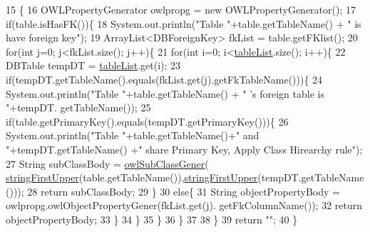 \begin{DoxyCode}
15                                                       \{
16         OWLPropertyGenerator owlpropg = \textcolor{keyword}{new} OWLPropertyGenerator();
17         \textcolor{keywordflow}{if}(table.isHasFK())\{
18               System.out.println(\textcolor{stringliteral}{"Table "}+table.getTableName() + \textcolor{stringliteral}{" is have foreign key"});
19               ArrayList<DBForeignKey> fkList = table.getFKlist();
20              \textcolor{keywordflow}{for}(\textcolor{keywordtype}{int} j=0; j<fkList.size(); j++)\{
21                  \textcolor{keywordflow}{for}(\textcolor{keywordtype}{int} i=0; i<\mbox{\hyperlink{classcom_1_1github_1_1aites_1_1framework_1_1ruleset_1_1_o_w_l_class_generator_a994d90ead25bc6713618ff0dbff19445}{tableList}}.size(); i++)\{
22                      DBTable tempDT = \mbox{\hyperlink{classcom_1_1github_1_1aites_1_1framework_1_1ruleset_1_1_o_w_l_class_generator_a994d90ead25bc6713618ff0dbff19445}{tableList}}.get(i);
23                      \textcolor{keywordflow}{if}(tempDT.getTableName().equals(fkList.get(j).getFkTableName()))\{
24                          System.out.println(\textcolor{stringliteral}{"Table "}+table.getTableName() + \textcolor{stringliteral}{" 's foreign table is "}+tempDT.
      getTableName());
25                          \textcolor{keywordflow}{if}(table.getPrimaryKey().equals(tempDT.getPrimaryKey()))\{
26                              System.out.println(\textcolor{stringliteral}{"Table "}+table.getTableName()+\textcolor{stringliteral}{" and "}+tempDT.getTableName()
      +\textcolor{stringliteral}{" share Primary Key, Apply Class Hirearchy rule"});
27                              String subClassBody = \mbox{\hyperlink{classcom_1_1github_1_1aites_1_1framework_1_1ruleset_1_1_o_w_l_class_generator_a0cf36bb6d9f8f69733fec05db8c82f09}{owlSubClassGener}}(
      \mbox{\hyperlink{classcom_1_1github_1_1aites_1_1framework_1_1ruleset_1_1_o_w_l_class_generator_aff3030ae03e75f8aa2b2114fc9a526d8}{stringFirstUpper}}(table.getTableName()),\mbox{\hyperlink{classcom_1_1github_1_1aites_1_1framework_1_1ruleset_1_1_o_w_l_class_generator_aff3030ae03e75f8aa2b2114fc9a526d8}{stringFirstUpper}}(tempDT.getTableName
      ()));
28                              \textcolor{keywordflow}{return} subClassBody;
29                          \}
30                          \textcolor{keywordflow}{else}\{
31                              String objectPropertyBody = owlpropg.owlObjectPropertyGener(fkList.get(j).
      getFkColumnName());
32                              \textcolor{keywordflow}{return} objectPropertyBody;
33                          \}
34                      \}
35                  \}
36              \}
37               
38         \}
39         \textcolor{keywordflow}{return} \textcolor{stringliteral}{""};
40     \}
\end{DoxyCode}
